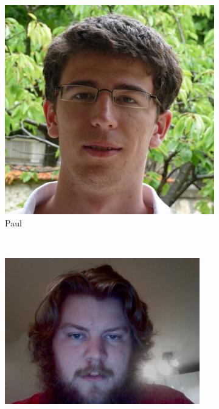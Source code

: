 \documentclass[a4paper,10pt]{article}
\begin{document}
\begin{titlepage}
\begin{center}
\begin{figure}[h]
\begin{subfigure}[b]{0.2\textwidth}
                \includegraphics[width=\textwidth]{paul.jpg}
                \caption{Paul}
                \label{fig:Paul}
        \end{subfigure}
        \\ %
        \begin{subfigure}[b]{0.2\textwidth}
                \centering
                \includegraphics[width=\textwidth]{sindri.jpeg}

\end{subfigure}
\end{figure}
\end{center}
\end{titlepage}
\end{document}
